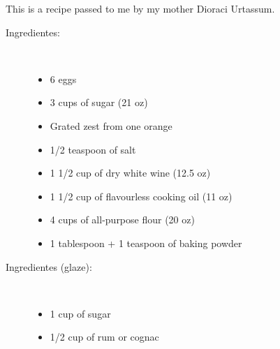 \documentclass[11pt,letterpaper]{article}
\begin{document}


This is a recipe passed to me by my mother Dioraci Urtassum.

\begin{description}

\item[Ingredientes:]\ \\
	\begin{itemize}
	\item 6 eggs
	\item 3 cups of sugar (21 oz)
	\item Grated zest from one orange
	\item 1/2 teaspoon of salt
	\item 1 1/2 cup of dry white wine (12.5 oz)
	\item 1 1/2 cup of flavourless cooking oil (11 oz)
	\item 4 cups of all-purpose flour (20 oz)
	\item 1 tablespoon + 1 teaspoon of baking powder
	\end{itemize}
	
\item[Ingredientes (glaze):]\ \\
	\begin{itemize}
	\item 1 cup of sugar
	\item 1/2 cup of rum or cognac 
	\end{itemize}
	

\end{description}
\end{document}
